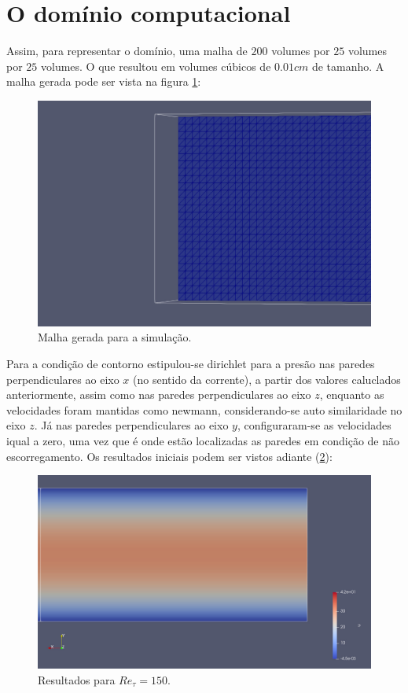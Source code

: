 \section{O domínio computacional}
Assim, para representar o domínio, uma malha de $200$ volumes por $25$ volumes por $25$ volumes. O que resultou em volumes cúbicos de $0.01cm$ de tamanho. A malha gerada pode ser vista na figura \ref{fig:malha}:

\begin{figure}[!h]
  \centering
  \includegraphics[angle=0, scale=0.25]{cap_fundamentacao/domain_mesh.jpeg}
  \caption{Malha gerada para a simulação.}
  \label{fig:malha}
\end{figure}

Para a condição de contorno estipulou-se dirichlet para a presão nas paredes perpendiculares ao eixo $x$ (no sentido da corrente), a partir dos valores caluclados anteriormente, assim como nas paredes perpendiculares ao eixo $z$, enquanto as velocidades foram mantidas como newmann, considerando-se auto similaridade no eixo $z$. Já nas paredes perpendiculares ao eixo $y$, configuraram-se as velocidades iqual a zero, uma vez que é onde estão localizadas as paredes em condição de não escorregamento. Os resultados iniciais podem ser vistos adiante (\ref{fig:first_results}):

\begin{figure}[!h]
  \centering
  \includegraphics[angle=0, scale=0.25]{cap_fundamentacao/first_results.jpeg}
  \caption{Resultados para $Re_\tau = 150$.}
  \label{fig:first_results}
\end{figure}
